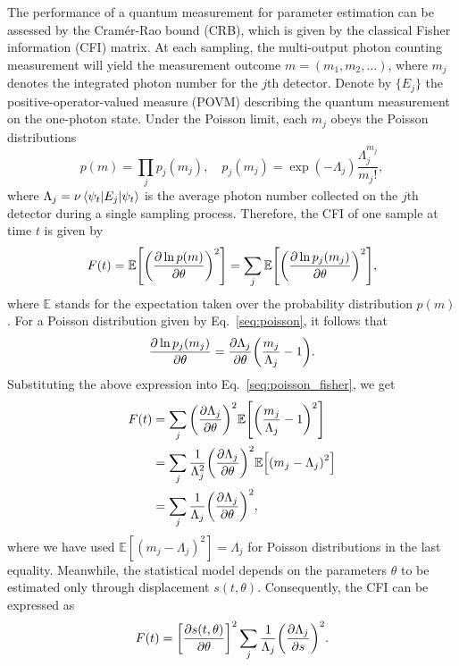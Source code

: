 \documentclass[aps,pra,10pt,showpacs,amsmath,amssymb,floatfix,superscriptaddress,twocolumn]{revtex4-2}
\begin{document}
The performance of a quantum measurement for parameter estimation can be assessed by the Cram\'er-Rao bound (CRB), which is given by the classical Fisher information (CFI) matrix.
At each sampling, the multi-output photon counting measurement will yield the measurement outcome \(m=(m_1, m_2, \ldots)\), where \(m_j\) denotes the integrated photon number for the \(j\)th detector.
Denote by \(\{E_j\}\) the positive-operator-valued measure (POVM) describing the quantum measurement on the one-photon state.
Under the Poisson limit, each \(m_j\) obeys the Poisson distributions~\cite{supp_Tsang2021, supp_Smith2010, supp_Starr2012}
\begin{equation} \label{seq:poisson}
  p(m) = \prod_j p_j(m_j),\quad p_j(m_j) = \exp(-\Lambda_j) \frac{\Lambda_j^{m_j}}{m_j!},
\end{equation}
where \(\Lambda_j = \nu \ev{E_j}{\psi_t}\) is the average photon number collected on the \(j\)th detector during a single sampling process.
Therefore, the CFI of one sample at time \(t\) is given by
\begin{align} \label{seq:poisson_fisher}
  F(t) = \mathbb E\qty[\qty(\pdv{\ln p(m)}{\theta})^2]
  = \sum_j \mathbb E\qty[\qty(\pdv{\ln p_j(m_j)}{\theta})^2],
\end{align}
where \(\mathbb E\) stands for the expectation taken over the probability distribution \(p(m)\).
For a Poisson distribution given by Eq.~\eqref{seq:poisson}, it follows that
\begin{equation}
  \pdv{\ln p_j(m_j)}{\theta} = \pdv{\Lambda_j}{\theta}\qty(\frac{m_j}{\Lambda_j} - 1).
\end{equation}
Substituting the above expression into Eq.~\eqref{seq:poisson_fisher}, we get
\begin{align}
  F(t) &= \sum_j \qty(\pdv{\Lambda_j}{\theta})^2 \mathbb{E}\qty[\qty(\frac{m_j}{\Lambda_j} - 1)^2]\\
  &=\sum_j \frac{1}{\Lambda_j^2} \qty(\pdv{\Lambda_j}{\theta})^2 \mathbb{E}\qty[\qty(m_j - \Lambda_j)^2]\\
  &=\sum_j \frac{1}{\Lambda_j}\qty(\pdv{\Lambda_j}{\theta})^2, \label{seq:poisson_fisher_result}
\end{align}
where we have used \(\mathbb{E}[(m_j - \Lambda_j)^2] = \Lambda_j\) for Poisson distributions in the last equality.
Meanwhile, the statistical model depends on the parameters \(\theta\) to be estimated only through displacement \(s(t, \theta)\).
Consequently, the CFI can be expressed as
\begin{equation} \label{seq:CFI_t}
  F(t) = \qty[\pdv{s(t,\theta)}{\theta}]^2 \sum_j \frac{1}{\Lambda_j}\qty(\pdv{\Lambda_j}{s})^2.
\end{equation}
\end{document}

